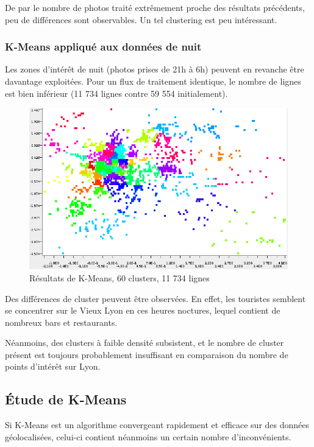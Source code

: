 De par le nombre de photos traité extrêmement proche des résultats précédents, peu de différences sont observables. Un tel clustering est peu intéressant.



\subsubsection{K-Means appliqué aux données de nuit}
Les zones d'intérêt de nuit (photos prises de 21h à 6h) peuvent en revanche être davantage exploitées. Pour un flux de traitement identique, le nombre de lignes est bien inférieur (11 734 lignes contre 59 554 initialement).

\begin{figure}[h!]
    \centering
    \includegraphics[width=\linewidth]{img/60_means_night.png}
    \caption{Résultats de K-Means, 60 clusters, 11 734 lignes}
\end{figure}

Des différences de cluster peuvent être observées. En effet, les touristes semblent se concentrer sur le Vieux Lyon en ces heures noctures, lequel contient de nombreux bars et restaurants.

Néanmoins, des clusters à faible densité subsistent, et le nombre de cluster présent est toujours probablement insuffisant en comparaison du nombre de points d'intérêt sur Lyon.


\subsection{Étude de K-Means}
Si K-Means est un algorithme convergeant rapidement et efficace sur des données géolocalisées, celui-ci contient néanmoins un certain nombre d'inconvénients.

